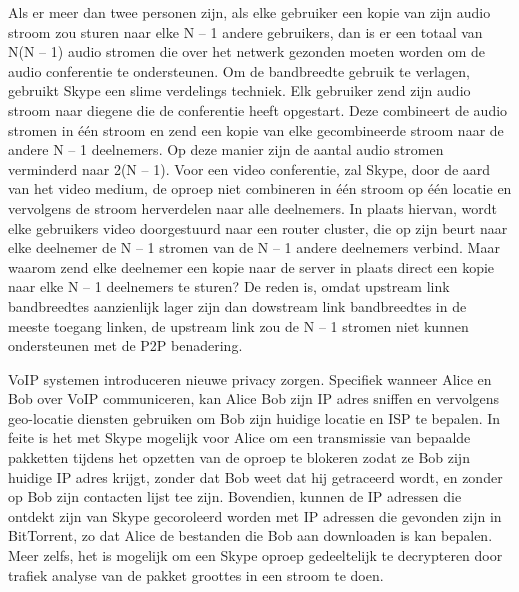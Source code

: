 Als er meer dan twee personen zijn, als elke gebruiker een kopie van zijn audio stroom zou sturen naar elke N – 1 andere gebruikers, dan is er een totaal van N(N – 1) audio stromen die over het netwerk gezonden moeten worden om de audio conferentie te ondersteunen. Om de bandbreedte gebruik te verlagen, gebruikt Skype een slime verdelings techniek. Elk gebruiker zend zijn audio stroom naar diegene die de conferentie heeft opgestart. Deze combineert de audio stromen in één stroom en zend een kopie van elke gecombineerde stroom naar de andere N – 1 deelnemers. Op deze manier zijn de aantal audio stromen verminderd naar 2(N – 1).
Voor een video conferentie, zal Skype, door de aard van het video medium, de oproep niet combineren in één stroom op één locatie en vervolgens de stroom herverdelen naar alle deelnemers. In plaats hiervan, wordt elke gebruikers video doorgestuurd naar een router cluster, die op zijn beurt naar elke deelnemer de N – 1 stromen van de N – 1 andere deelnemers verbind.
Maar waarom zend elke deelnemer een kopie naar de server in plaats direct een kopie naar elke N – 1 deelnemers te sturen? De reden is, omdat upstream link bandbreedtes aanzienlijk lager zijn dan dowstream link bandbreedtes in de meeste toegang linken, de upstream link zou de N – 1 stromen niet kunnen ondersteunen met de P2P benadering.

VoIP systemen introduceren nieuwe privacy zorgen. Specifiek wanneer Alice en Bob over VoIP communiceren, kan Alice Bob zijn IP adres sniffen en vervolgens geo-locatie diensten gebruiken om Bob zijn huidige locatie  en ISP te bepalen. In feite is het met Skype mogelijk voor Alice om een transmissie van bepaalde pakketten tijdens het opzetten van de oproep te blokeren zodat ze Bob zijn huidige IP adres krijgt, zonder dat Bob weet dat hij getraceerd wordt, en zonder op Bob zijn contacten lijst tee zijn. Bovendien, kunnen de IP adressen die ontdekt zijn van Skype gecoroleerd worden met IP adressen die gevonden zijn in BitTorrent, zo dat Alice de bestanden die Bob aan downloaden is kan bepalen. Meer zelfs, het is mogelijk om een Skype oproep gedeeltelijk te decrypteren door trafiek analyse van de pakket groottes in een stroom te doen.

